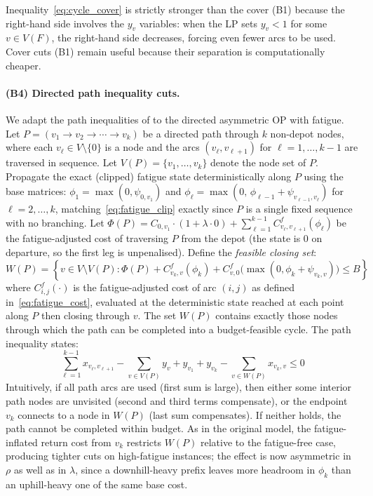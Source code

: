 \documentclass[11pt,a4paper]{article}
\begin{document}
Inequality~\eqref{eq:cycle_cover} is strictly stronger than the cover (B1) because the right-hand side involves the $y_v$ variables: when the LP sets $y_v < 1$ for some $v \in V(F)$, the right-hand side decreases, forcing even fewer arcs to be used.
Cover cuts (B1) remain useful because their separation is computationally cheaper.

\paragraph{(B4) Directed path inequality cuts.}
We adapt the path inequalities of \citet{fischetti1998solving} to the directed asymmetric OP with fatigue.
Let $P = (v_1 \to v_2 \to \cdots \to v_k)$ be a directed path through $k$ non-depot nodes, where each $v_\ell \in V \setminus \{0\}$ is a node and the arcs $(v_\ell, v_{\ell+1})$ for $\ell = 1, \ldots, k-1$ are traversed in sequence.
Let $V(P) = \{v_1, \ldots, v_k\}$ denote the node set of $P$.
Propagate the exact (clipped) fatigue state deterministically along $P$ using the base matrices: $\phi_1 = \max(0, \psi_{0,v_1})$ and $\phi_\ell = \max(0,\, \phi_{\ell-1} + \psi_{v_{\ell-1}, v_\ell})$ for $\ell = 2, \ldots, k$, matching~\eqref{eq:fatigue_clip} exactly since $P$ is a single fixed sequence with no branching.
Let $\Phi(P) = C_{0,v_1} \cdot (1 + \lambda \cdot 0) + \sum_{\ell=1}^{k-1} C_{v_\ell, v_{\ell+1}}^f(\phi_\ell)$ be the fatigue-adjusted cost of traversing $P$ from the depot (the state is $0$ on departure, so the first leg is unpenalised).
Define the \emph{feasible closing set}:
\begin{equation}
  W(P) = \left\{ v \in V \setminus V(P) : \Phi(P) + C_{v_k, v}^f(\phi_k) + C_{v, 0}^f\bigl(\max(0, \phi_k + \psi_{v_k, v})\bigr) \leq B \right\}
  \label{eq:wp}
\end{equation}
where $C_{i,j}^f(\cdot)$ is the fatigue-adjusted cost of arc $(i,j)$ as defined in~\eqref{eq:fatigue_cost}, evaluated at the deterministic state reached at each point along $P$ then closing through $v$.
The set $W(P)$ contains exactly those nodes through which the path can be completed into a budget-feasible cycle.
The path inequality states:
\begin{equation}
  \sum_{\ell=1}^{k-1} x_{v_\ell, v_{\ell+1}} - \sum_{v \in V(P)} y_v + y_{v_1} + y_{v_k} - \sum_{v \in W(P)} x_{v_k, v} \leq 0
  \label{eq:path_ineq}
\end{equation}
Intuitively, if all path arcs are used (first sum is large), then either some interior path nodes are unvisited (second and third terms compensate), or the endpoint $v_k$ connects to a node in $W(P)$ (last sum compensates).
If neither holds, the path cannot be completed within budget.
As in the original model, the fatigue-inflated return cost from $v_k$ restricts $W(P)$ relative to the fatigue-free case, producing tighter cuts on high-fatigue instances; the effect is now asymmetric in $\rho$ as well as in $\lambda$, since a downhill-heavy prefix leaves more headroom in $\phi_k$ than an uphill-heavy one of the same base cost.
\end{document}
